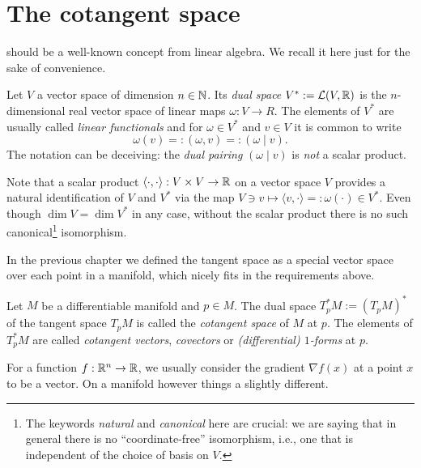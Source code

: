 \section{The cotangent space}

 should be a well-known concept from linear algebra. We recall it here just for the sake of convenience.

\begin{definition}
  Let $V$ a vector space of dimension $n\in \mathbb{N}$.
  Its \emph{dual space} $V^* := \mathcal{L}(V, \mathbb{R})$ is the $n$-dimensional real vector space of linear maps $\omega:V \to R$.
  The elements of $V^*$ are usually called \emph{linear functionals} and for $\omega\in V^*$ and $v\in V$ it is common to write
  \begin{equation}
    \omega(v) =: (\omega, v) =: (\omega \mid v).
  \end{equation}
  The notation can be deceiving: the \emph{dual pairing} $(\omega \mid v)$ is \emph{not} a scalar product.
\end{definition}

\begin{remark}\label{rmk:identification}
  Note that a scalar product $\langle\cdot, \cdot\rangle :  V\times V \to \mathbb{R}$ on a vector space $V$ provides a natural identification of $V$ and $V^*$ via the map $V\ni v \mapsto \langle v, \cdot \rangle =: \omega(\cdot) \in V^*$.
  Even though $\dim V = \dim V^*$ in any case, without the scalar product there is no such canonical\footnote{The keywords \emph{natural} and \emph{canonical} here are crucial: we are saying that in general there is no ``coordinate-free'' isomorphism, i.e., one that is independent of the choice of basis on $V$.} isomorphism.
\end{remark}

In the previous chapter we defined the tangent space as a special vector space over each point in a manifold, which nicely fits in the requirements above.

\begin{definition}
  Let $M$ be a differentiable manifold and $p\in M$.
  The dual space $T_p^*M := (T_pM)^*$ of the tangent space $T_pM$ is called the \emph{cotangent space} of $M$ at $p$.
  The elements of $T^*_pM$ are called \emph{cotangent vectors}, \emph{covectors} or \emph{(differential) $1$-forms} at $p$.
\end{definition}

For a function $f:\mathbb{R}^n\to\mathbb{R}$, we usually consider the gradient $\nabla f(x)$ at a point $x$ to be a vector.
On a manifold however things a slightly different.

